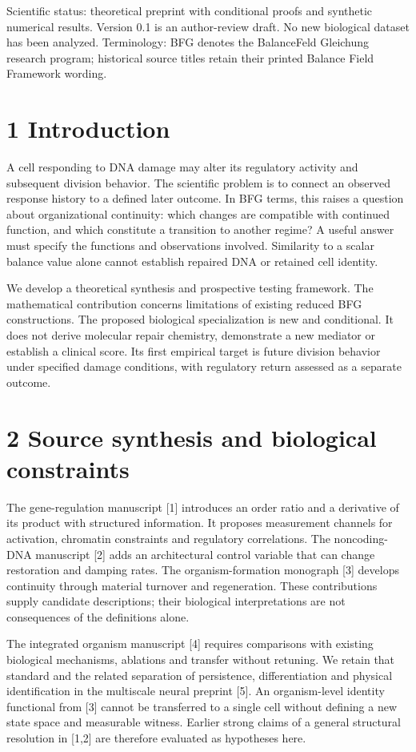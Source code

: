 \documentclass[11pt,a4paper]{article}
\begin{document}
Scientific status: theoretical preprint with conditional proofs and synthetic numerical results. Version 0.1 is an author-review draft. No new biological dataset has been analyzed. Terminology: BFG denotes the BalanceFeld Gleichung research program; historical source titles retain their printed Balance Field Framework wording.

\clearpage
\section*{1 Introduction}
A cell responding to DNA damage may alter its regulatory activity and subsequent division behavior. The scientific problem is to connect an observed response history to a defined later outcome. In BFG terms, this raises a question about organizational continuity: which changes are compatible with continued function, and which constitute a transition to another regime? A useful answer must specify the functions and observations involved. Similarity to a scalar balance value alone cannot establish repaired DNA or retained cell identity.

We develop a theoretical synthesis and prospective testing framework. The mathematical contribution concerns limitations of existing reduced BFG constructions. The proposed biological specialization is new and conditional. It does not derive molecular repair chemistry, demonstrate a new mediator or establish a clinical score. Its first empirical target is future division behavior under specified damage conditions, with regulatory return assessed as a separate outcome.

\section*{2 Source synthesis and biological constraints}
The gene-regulation manuscript [1] introduces an order ratio and a derivative of its product with structured information. It proposes measurement channels for activation, chromatin constraints and regulatory correlations. The noncoding-DNA manuscript [2] adds an architectural control variable that can change restoration and damping rates. The organism-formation monograph [3] develops continuity through material turnover and regeneration. These contributions supply candidate descriptions; their biological interpretations are not consequences of the definitions alone.

The integrated organism manuscript [4] requires comparisons with existing biological mechanisms, ablations and transfer without retuning. We retain that standard and the related separation of persistence, differentiation and physical identification in the multiscale neural preprint [5]. An organism-level identity functional from [3] cannot be transferred to a single cell without defining a new state space and measurable witness. Earlier strong claims of a general structural resolution in [1,2] are therefore evaluated as hypotheses here.
\end{document}
